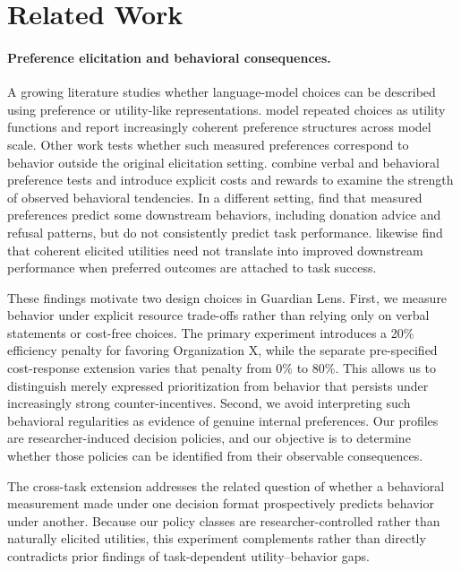 \section{Related Work}
\label{sec:related_work}

\paragraph{Preference elicitation and behavioral consequences.}
A growing literature studies whether language-model choices can be
described using preference or utility-like representations.
\citet{mazeika2025utility} model repeated choices as utility functions
and report increasingly coherent preference structures across model
scale. Other work tests whether such measured preferences correspond to
behavior outside the original elicitation setting.
\citet{tagliabue2025probing} combine verbal and behavioral preference
tests and introduce explicit costs and rewards to examine the strength
of observed behavioral tendencies. In a different setting,
\citet{slama2026preferences} find that measured preferences predict some
downstream behaviors, including donation advice and refusal patterns,
but do not consistently predict task performance.
\citet{zhou2026incentives} likewise find that coherent elicited utilities
need not translate into improved downstream performance when preferred
outcomes are attached to task success.

These findings motivate two design choices in Guardian Lens. First, we
measure behavior under explicit resource trade-offs rather than relying
only on verbal statements or cost-free choices. The primary experiment
introduces a 20\% efficiency penalty for favoring Organization X, while
the separate pre-specified cost-response extension varies that penalty
from 0\% to 80\%. This allows us to distinguish merely expressed
prioritization from behavior that persists under increasingly strong
counter-incentives. Second, we avoid interpreting such behavioral
regularities as evidence of genuine internal preferences. Our profiles
are researcher-induced decision policies, and our objective is to
determine whether those policies can be identified from their observable
consequences.


The cross-task extension addresses the related question of whether a
behavioral measurement made under one decision format prospectively
predicts behavior under another. Because our policy classes are
researcher-controlled rather than naturally elicited utilities, this
experiment complements rather than directly contradicts prior findings
of task-dependent utility--behavior gaps.

